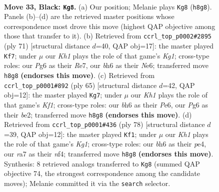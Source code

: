 \documentclass[11pt]{article}
\begin{document}
\clearpage

\begin{figure}[p]\centering
\begin{subfigure}{0.46\textwidth}\centering
\resizebox{\linewidth}{!}{%
\newchessgame
\chessboard[
  setfen={2r4k/R6p/2p2ppB/8/5P1P/3P1N2/PPP2PK1/8 b - - 0 33},
  showmover=false,
  pgfstyle=straightmove, color=movearrow, markmove={h8-g8}
]}
\caption{}
\end{subfigure}\hfill
\begin{subfigure}{0.46\textwidth}\centering
\resizebox{\linewidth}{!}{%
\newchessgame
\chessboard[
  setfen={6k1/p3r3/4n2p/4Ppp1/2p5/2P2PB1/6PP/R5K1 b - - 1 36},
  showmover=false,
  pgfstyle=straightmove, color=movearrow, markmove={g8-f7}
]}
\caption{}
\end{subfigure}
\\[4pt]
\begin{subfigure}{0.46\textwidth}\centering
\resizebox{\linewidth}{!}{%
\newchessgame
\chessboard[
  setfen={2r2k2/5p2/p3p2p/1p2P3/1P3P2/P6R/1n2BP2/4K3 b - - 1 33},
  showmover=false,
  pgfstyle=straightmove, color=movearrow, markmove={f8-g7}
]}
\caption{}
\end{subfigure}\hfill
\begin{subfigure}{0.46\textwidth}\centering
\resizebox{\linewidth}{!}{%
\newchessgame
\chessboard[
  setfen={8/6pk/p1p5/3p3p/PP2pn1P/8/6P1/1R4K1 w - - 0 40},
  showmover=false,
  pgfstyle=straightmove, color=movearrow, markmove={g1-f1}
]}
\caption{}
\end{subfigure}
\caption{\textbf{Move 33, Black: \texttt{Kg8}.} (a) Our position; Melanie plays \texttt{Kg8} (\texttt{h8g8}). Panels (b)--(d) are the retrieved master positions whose correspondence most drove this move (highest QAP objective among those that transfer to it). (b) Retrieved from \texttt{ccrl\_top\_p0002\#2895} (ply 71) [structural distance $d$=40, QAP obj=17]: the master played \texttt{Kf7}; under $\mu$ our \emph{Kh1} plays the role of that game's \emph{Kg1}; cross-type roles: our \emph{P}g6 as their \emph{R}e7, our \emph{b}h6 as their \emph{N}e6; transferred move \texttt{h8g8} \textbf{(endorses this move)}. (c) Retrieved from \texttt{ccrl\_top\_p0001\#892} (ply 65) [structural distance $d$=42, QAP obj=12]: the master played \texttt{Kg7}; under $\mu$ our \emph{Kh1} plays the role of that game's \emph{Kf1}; cross-type roles: our \emph{b}h6 as their \emph{P}e6, our \emph{P}g6 as their \emph{b}e2; transferred move \texttt{h8g8} \textbf{(endorses this move)}. (d) Retrieved from \texttt{ccrl\_top\_p0001\#436} (ply 78) [structural distance $d$=39, QAP obj=12]: the master played \texttt{Kf1}; under $\mu$ our \emph{Kh1} plays the role of that game's \emph{Kg1}; cross-type roles: our \emph{b}h6 as their \emph{p}e4, our \emph{r}a7 as their \emph{n}f4; transferred move \texttt{h8g8} \textbf{(endorses this move)}. Synthesis: 8 retrieved analogs transferred to \texttt{Kg8} (summed QAP objective 74, the strongest correspondence among the candidate moves); Melanie committed it via the \texttt{search} selector.}
\label{fig:thought-m65}
\end{figure}
\end{document}
